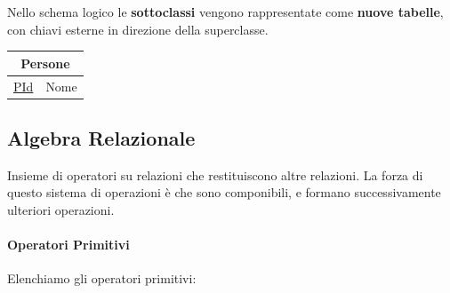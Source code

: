 \documentclass{article}
\begin{document}
\newpage

Nello schema logico le \textbf{sottoclassi} vengono rappresentate come \textbf{nuove tabelle}, con chiavi esterne in direzione
della superclasse.

\vspace*{10px}

\begin{center}
\begin{tabular}{ |c|c| }
    \hline
    \multicolumn{2}{|c|}{Persone} \\
    \hline
    \underline{PId} & Nome \\
    \hline
\end{tabular}
\end{center}


\vspace*{10px}

\subsection{Algebra Relazionale}

Insieme di operatori su relazioni che restituiscono altre relazioni. La forza di questo sistema di operazioni è che sono componibili, e formano successivamente ulteriori operazioni.

\paragraph{Operatori Primitivi} Elenchiamo gli operatori primitivi:
\end{document}
